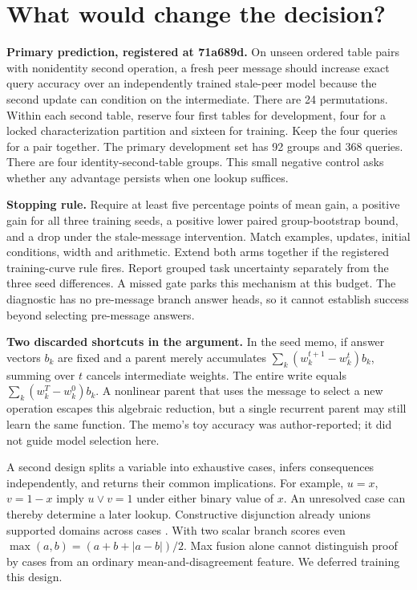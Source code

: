 \documentclass[11pt]{article}
\begin{document}
\section*{What would change the decision?}
\textbf{Primary prediction, registered at 71a689d.} On unseen ordered table pairs with nonidentity second operation, a fresh peer message should increase exact query accuracy over an independently trained stale-peer model because the second update can condition on the intermediate. There are 24 permutations. Within each second table, reserve four first tables for development, four for a locked characterization partition and sixteen for training. Keep the four queries for a pair together. The primary development set has 92 groups and 368 queries. There are four identity-second-table groups. This small negative control asks whether any advantage persists when one lookup suffices.
\par
\textbf{Stopping rule.} Require at least five percentage points of mean gain, a positive gain for all three training seeds, a positive lower paired group-bootstrap bound, and a drop under the stale-message intervention. Match examples, updates, initial conditions, width and arithmetic. Extend both arms together if the registered training-curve rule fires. Report grouped task uncertainty separately from the three seed differences. A missed gate parks this mechanism at this budget. The diagnostic has no pre-message branch answer heads, so it cannot establish success beyond selecting pre-message answers.
\par
\textbf{Two discarded shortcuts in the argument.} In the seed memo, if answer vectors $b_k$ are fixed and a parent merely accumulates $\sum_k(w^{t+1}_k-w^t_k)b_k$, summing over $t$ cancels intermediate weights. The entire write equals $\sum_k(w^T_k-w^0_k)b_k$. A nonlinear parent that uses the message to select a new operation escapes this algebraic reduction, but a single recurrent parent may still learn the same function. The memo's toy accuracy was author-reported; it did not guide model selection here.
\par
A second design splits a variable into exhaustive cases, infers consequences independently, and returns their common implications. For example, $u=x$, $v=1-x$ imply $u\lor v=1$ under either binary value of $x$. An unresolved case can thereby determine a later lookup. Constructive disjunction already unions supported domains across cases \cite{cc}. With two scalar branch scores even $\max(a,b)=(a+b+|a-b|)/2$. Max fusion alone cannot distinguish proof by cases from an ordinary mean-and-disagreement feature. We deferred training this design.
\end{document}
